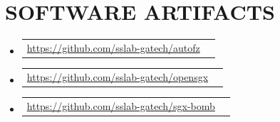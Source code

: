 \documentclass[letterpaper,11pt]{article}
\makeatletter
\newcommand{\softwareArtifactHeading}[2]{
    \item[]
    \begin{tabular*}{1.00\textwidth}{l@{\extracolsep{\fill}}r}
      \hspace{0em}\small#1 & \small #2  \\
    \end{tabular*}\vspace{-7pt}
}
\newcommand{\resumeSubHeadingListStart}{\begin{itemize}[leftmargin=0.0in, label={}, itemsep=8pt, topsep=2pt]}
\newcommand{\resumeSubHeadingListEnd}{\end{itemize}}
\makeatother
\begin{document}
\section{SOFTWARE ARTIFACTS}
\resumeSubHeadingListStart
    \softwareArtifactHeading
    {\makebox[2.2cm][l]{\textbf{Autofz:}} {\href{https://github.com/sslab-gatech/autofz}{\faGithub  \hspace{0.1em} https://github.com/sslab-gatech/autofz}}} 
    {\makebox[1.0cm][l]{\faCodeFork 12} \makebox[1.0cm][l]{\faStar 85}}
    \softwareArtifactHeading
    {\makebox[2.2cm][l]{\textbf{OpenSGX:}} {\href{https://github.com/sslab-gatech/opensgx}{\faGithub  \hspace{0.1em} https://github.com/sslab-gatech/opensgx}}}
    {\makebox[1.0cm][l]{\faCodeFork 82} \makebox[1.0cm][l]{\faStar 308}}
     \softwareArtifactHeading
    {\makebox[2.2cm][l]{\textbf{SGXBomb:}} {\href{https://github.com/sslab-gatech/sgx-bomb}{\faGithub  \hspace{0.1em} https://github.com/sslab-gatech/sgx-bomb}}}
    {\makebox[1.0cm][l]{\faCodeFork 4} \makebox[1.0cm][l]{\faStar 18}}
\resumeSubHeadingListEnd
\vspace{7pt}
\end{document}
